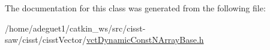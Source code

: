 The documentation for this class was generated from the following file\-:\begin{DoxyCompactItemize}
\item 
/home/adeguet1/catkin\-\_\-ws/src/cisst-\/saw/cisst/cisst\-Vector/\hyperlink{vct_dynamic_const_n_array_base_8h}{vct\-Dynamic\-Const\-N\-Array\-Base.\-h}\end{DoxyCompactItemize}
